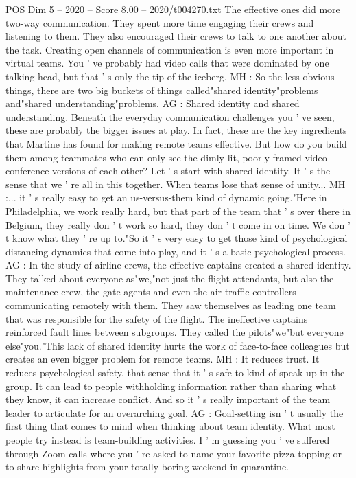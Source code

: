 \begin{textsample}{POS Dim 5 – 2020 – Score 8.00 – 2020/t004270.txt}
The effective ones did more two-way communication.
They spent more time engaging their crews and listening to them.
They also encouraged their crews to talk to one another about the task.
Creating open channels of communication is even more important in virtual teams.
You ' ve probably had video calls that were dominated by one talking head, but that ' s only the tip of the iceberg.
MH : So the less obvious things, there are two big buckets of things called"shared identity"problems and"shared understanding"problems.
AG : Shared identity and shared understanding.
Beneath the everyday communication challenges you ' ve seen, these are probably the bigger issues at play.
In fact, these are the key ingredients that Martine has found for making remote teams effective.
But how do you build them among teammates who can only see the dimly lit, poorly framed video conference versions of each other?
Let ' s start with shared identity.
It ' s the sense that we ' re all in this together.
When teams lose that sense of unity...
MH :... it ' s really easy to get an us-versus-them kind of dynamic going."Here in Philadelphia, we work really hard, but that part of the team that ' s over there in Belgium, they really don ' t work so hard, they don ' t come in on time.
We don ' t know what they ' re up to."So it ' s very easy to get those kind of psychological distancing dynamics that come into play, and it ' s a basic psychological process.
AG : In the study of airline crews, the effective captains created a shared identity.
They talked about everyone as"we,"not just the flight attendants, but also the maintenance crew, the gate agents and even the air traffic controllers communicating remotely with them.
They saw themselves as leading one team that was responsible for the safety of the flight.
The ineffective captains reinforced fault lines between subgroups.
They called the pilots"we"but everyone else"you."This lack of shared identity hurts the work of face-to-face colleagues but creates an even bigger problem for remote teams.
MH : It reduces trust.
It reduces psychological safety, that sense that it ' s safe to kind of speak up in the group.
It can lead to people withholding information rather than sharing what they know, it can increase conflict.
And so it ' s really important of the team leader to articulate for an overarching goal.
AG : Goal-setting isn ' t usually the first thing that comes to mind when thinking about team identity.
What most people try instead is team-building activities.
I ' m guessing you ' ve suffered through Zoom calls where you ' re asked to name your favorite pizza topping or to share highlights from your totally boring weekend in quarantine.

\end{textsample}
